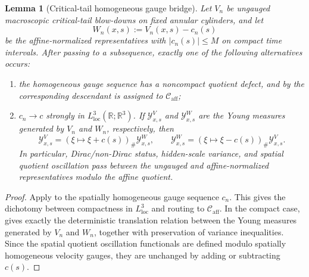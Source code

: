 \documentclass[11pt]{amsart}
\numberwithin{equation}{section}
\theoremstyle{plain}
\newtheorem{lemma}[lemma]{Lemma}
\theoremstyle{definition}
\theoremstyle{remark}
\newcommand{\loc}{\mathrm{loc}}
\newcommand{\Caff}{\mathcal C_{\mathrm{aff}}}
\begin{document}
\begin{lemma}[Critical-tail homogeneous gauge bridge]
\label{lem:critical-tail-homogeneous-gauge-bridge}
Let \(V_n\) be ungauged macroscopic critical-tail blow-downs on fixed annular
cylinders, and let
\[
   W_n(x,s):=V_n(x,s)-c_n(s)
\]
be the affine-normalized representatives with \(|c_n(s)|\le M\) on compact
time intervals.  After passing to a subsequence, exactly one of the following
alternatives occurs:
\begin{enumerate}[label=\textup{(\roman*)}]
   \item the homogeneous gauge sequence has a noncompact quotient defect, and by
    the corresponding descendant is
   assigned to \(\Caff\);
   \item \(c_n\to c\) strongly in \(L^3_{\loc}(\mathbb R;\mathbb R^3)\).  If
   \(\mathcal Y^V_{x,s}\) and \(\mathcal Y^W_{x,s}\) are the Young measures
   generated by \(V_n\) and \(W_n\), respectively, then
   \[
      \mathcal Y^V_{x,s}
      =
      (\xi\mapsto \xi+c(s))_\#\mathcal Y^W_{x,s},
      \qquad
      \mathcal Y^W_{x,s}
      =
      (\xi\mapsto \xi-c(s))_\#\mathcal Y^V_{x,s}.
   \]
   In particular, Dirac/non-Dirac status, hidden-scale variance, and spatial
   quotient oscillation pass between the ungauged and affine-normalized
   representatives modulo the affine quotient.
\end{enumerate}
\end{lemma}

\begin{proof}
Apply  to the spatially homogeneous
gauge sequence \(c_n\).  This gives the dichotomy between compactness in
\(L^3_{\loc}\) and routing to \(\Caff\).  In the compact case,
 gives exactly the deterministic
translation relation between the Young measures generated by \(V_n\) and
\(W_n\), together with preservation of variance inequalities.  Since the
spatial quotient oscillation functionals are defined modulo spatially homogeneous
velocity gauges, they are unchanged by adding or subtracting \(c(s)\).
\end{proof}
\end{document}
